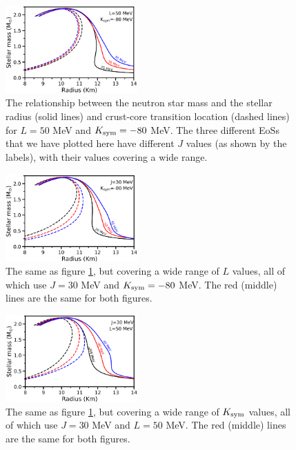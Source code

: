 \documentclass[fleqn,usenatbib]{mnras}
\begin{document}
\begin{figure}
\centering
\includegraphics[width=0.45\textwidth,angle=0]{MRs_Jvals_full.png}
\caption{The relationship between the neutron star mass and the stellar radius (solid lines) and crust-core transition location (dashed lines) for $L=50$ MeV and $K_{\rm sym}=-80$ MeV. The three different EoSs that we have plotted here have different $J$ values (as shown by the labels), with their values covering a wide range.} %
\label{fig:MR_Jvals}
\end{figure}

\begin{figure}
\centering
\includegraphics[width=0.45\textwidth,angle=0]{MRs_Lvals_full.png}
\caption{The same as figure \ref{fig:MR_Jvals}, but covering a wide range of $L$ values, all of which use $J=30$ MeV and $K_{\rm sym}=-80$ MeV. The red (middle) lines are the same for both figures.}
\label{fig:MR_Lvals}
\end{figure}

\begin{figure}
\centering
\includegraphics[width=0.45\textwidth,angle=0]{MRs_Kvals_full.png}
\caption{The same as figure \ref{fig:MR_Jvals}, but covering a wide range of $K_{\rm sym}$ values, all of which use $J=30$ MeV and $L=50$ MeV. The red (middle) lines are the same for both figures.}
\label{fig:MR_Kvals}
\end{figure}
\end{document}

